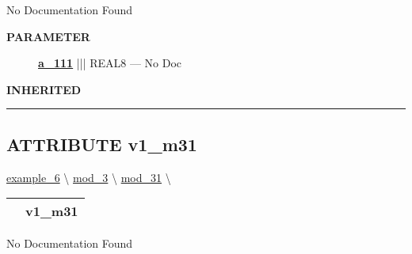 \par





No Documentation Found






\par
\begin{description}
\item [\colorbox{tagtype}{\color{white} \textbf{\textsf{PARAMETER}}}] \textbf{\underline{a\_111}} ||| REAL8 --- No Doc
\end{description}








\par
\begin{description}
\item [\colorbox{tagtype}{\color{white} \textbf{\textsf{INHERITED}}}] 
\end{description}



\rule{\linewidth}{0.5pt}
\subsection*{\textsf{\colorbox{headtoc}{\color{white} ATTRIBUTE}
v1\_m31}}

\hypertarget{ecldoc:intest.in1intest.example_6.mod_3.mod_31.v1_m31}{}
\hspace{0pt} \hyperlink{ecldoc:intest.in1intest.example_6}{example_6} \textbackslash 
\hspace{0pt} \hyperlink{ecldoc:intest.in1intest.example_6.mod_3}{mod_3} \textbackslash 
\hspace{0pt} \hyperlink{ecldoc:intest.in1intest.example_6.mod_3.mod_31}{mod_31} \textbackslash 

{\renewcommand{\arraystretch}{1.5}
\begin{tabularx}{\textwidth}{|>{\raggedright\arraybackslash}l|X|}
\hline
\hspace{0pt}\mytexttt{\color{red} } & \textbf{v1\_m31} \\
\hline
\end{tabularx}
}

\par





No Documentation Found








